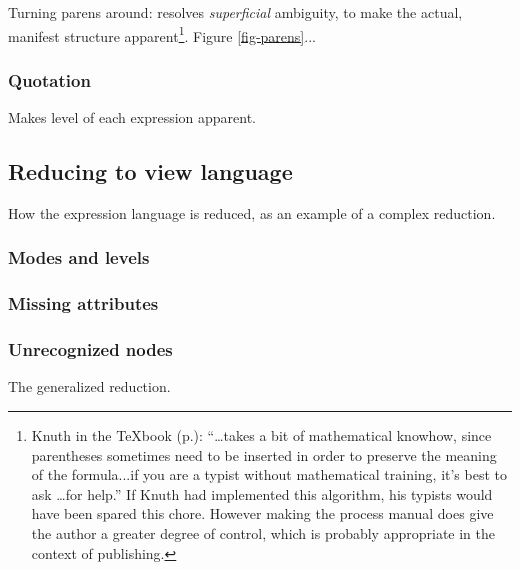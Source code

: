 Turning parens around: resolves \emph{superficial} ambiguity, to make the actual, manifest structure apparent\footnote{Knuth in the TeXbook (p.): ``\dots takes a bit of mathematical knowhow, since parentheses sometimes need to be inserted in order to preserve the meaning of the formula...if you are a typist without mathematical training, it's best to ask \dots for help.'' If Knuth had implemented this algorithm, his typists would have been spared this chore. However making the process manual does give the author a greater degree of control, which is probably appropriate in the context of publishing.}. Figure \ref{fig-parens}...



\subsubsection{Quotation}
Makes level of each expression apparent.


\subsection{Reducing to view language}
How the expression language is reduced, as an example of a complex reduction. 

\subsubsection{Modes and levels}

\subsubsection{Missing attributes}

\subsubsection{Unrecognized nodes}
The generalized reduction.